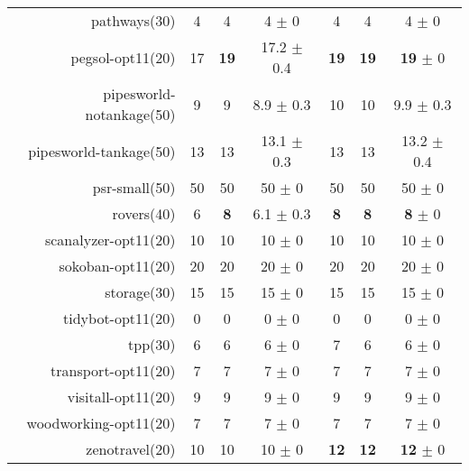 \begin{center}
\begin{tabular}{|r|*{2}{ccc|}}
pathways(30) & 4 & 4 & 4 \(\pm\) 0 & 4 & 4 & 4 \(\pm\) 0\\
pegsol-opt11(20) & 17 & \textbf{19} & 17.2 \(\pm\) 0.4 & \textbf{19} & \textbf{19} & \textbf{19} \(\pm\) 0\\
pipesworld-notankage(50) & 9 & 9 & 8.9 \(\pm\) 0.3 & 10 & 10 & 9.9 \(\pm\) 0.3\\
pipesworld-tankage(50) & 13 & 13 & 13.1 \(\pm\) 0.3 & 13 & 13 & 13.2 \(\pm\) 0.4\\
psr-small(50) & 50 & 50 & 50 \(\pm\) 0 & 50 & 50 & 50 \(\pm\) 0\\
rovers(40) & 6 & \textbf{8} & 6.1 \(\pm\) 0.3 & \textbf{8} & \textbf{8} & \textbf{8} \(\pm\) 0\\
scanalyzer-opt11(20) & 10 & 10 & 10 \(\pm\) 0 & 10 & 10 & 10 \(\pm\) 0\\
sokoban-opt11(20) & 20 & 20 & 20 \(\pm\) 0 & 20 & 20 & 20 \(\pm\) 0\\
storage(30) & 15 & 15 & 15 \(\pm\) 0 & 15 & 15 & 15 \(\pm\) 0\\
tidybot-opt11(20) & 0 & 0 & 0 \(\pm\) 0 & 0 & 0 & 0 \(\pm\) 0\\
tpp(30) & 6 & 6 & 6 \(\pm\) 0 & 7 & 6 & 6 \(\pm\) 0\\
transport-opt11(20) & 7 & 7 & 7 \(\pm\) 0 & 7 & 7 & 7 \(\pm\) 0\\
visitall-opt11(20) & 9 & 9 & 9 \(\pm\) 0 & 9 & 9 & 9 \(\pm\) 0\\
woodworking-opt11(20) & 7 & 7 & 7 \(\pm\) 0 & 7 & 7 & 7 \(\pm\) 0\\
zenotravel(20) & 10 & 10 & 10 \(\pm\) 0 & \textbf{12} & \textbf{12} & \textbf{12} \(\pm\) 0\\
\end{tabular}
\end{center}
